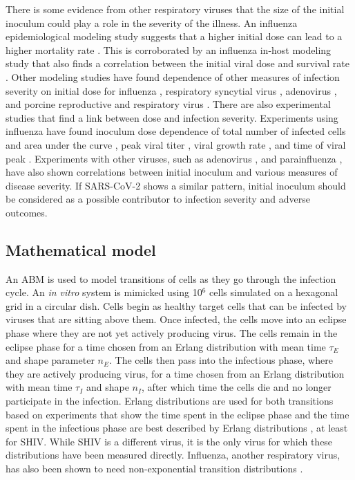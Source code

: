 There is some evidence from other respiratory viruses that the size of the initial inoculum could play a role in the severity of the illness. An influenza epidemiological modeling study suggests that a higher initial dose can lead to a higher mortality rate \citep{paulo10}. This is corroborated by an influenza in-host modeling study that also finds a correlation between the initial viral dose and survival rate \citep{price15}. Other modeling studies have found dependence of other measures of infection severity on initial dose for influenza \citep{moore20}, respiratory syncytial virus \citep{wethington19}, adenovirus \citep{li14}, and porcine reproductive and respiratory virus \citep{go19}. There are also experimental studies that find a link between dose and infection severity. Experiments using influenza have found inoculum dose dependence of total number of infected cells and area under the curve \citep{manicassamy10}, peak viral titer \citep{ginsberg52,iida63,ottolini05}, viral growth rate \citep{ginsberg52}, and time of viral peak \citep{iida63,ginsberg52}. Experiments with other viruses, such as adenovirus \citep{prince93}, and parainfluenza \citep{ottolini96}, have also shown correlations between initial inoculum and various measures of disease severity. If SARS-CoV-2 shows a similar pattern, initial inoculum should be considered as a possible contributor to infection severity and adverse outcomes.

\subsection{Mathematical model}

An ABM is used to model transitions of cells as they go through the infection cycle. An \emph{in vitro} system is mimicked using 10$^6$ cells simulated on a hexagonal grid in a circular dish. Cells begin as healthy target cells that can be infected by viruses that are sitting above them. Once infected, the cells move into an eclipse phase where they are not yet actively producing virus. The cells remain in the eclipse phase for a time chosen from an Erlang distribution with mean time $\tau_E$ and shape parameter $n_E$. The cells then pass into the infectious phase, where they are actively producing virus, for a time chosen from an Erlang distribution with mean time $\tau_I$ and shape $n_I$, after which time the cells die and no longer participate in the infection. Erlang distributions are used for both transitions based on experiments that show the time spent in the eclipse phase and the time spent in the infectious phase are best described by Erlang distributions \citep{kakizoe15, beauchemin17}, at least for SHIV. While SHIV is a different virus, it is the only virus for which these distributions have been measured directly. Influenza, another respiratory virus, has also been shown to need non-exponential transition distributions \citep{holder11autoimm, holder11}. 

